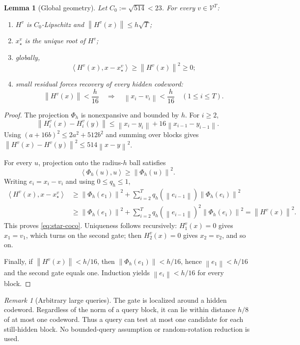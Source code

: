 \documentclass[11pt,a4paper]{article}
\newcommand{\norm}[1]{\left\lVert #1\right\rVert}
\newcommand{\inner}[2]{\left\langle #1,#2\right\rangle}
\newcommand{\cV}{\mathcal V}
\newtheorem{lemma}[theorem]{Lemma}
\theoremstyle{definition}
\theoremstyle{remark}
\newtheorem{remark}[theorem]{Remark}
\begin{document}
\begin{lemma}[Global geometry]\label{lem:geometry}
Let $C_0:=\sqrt{514}<23$.  For every $v\in\cV^T$:
\begin{enumerate}[label=(\roman*)]
\item $H^v$ is $C_0$-Lipschitz and $\norm{H^v(x)}\le h\sqrt T$;
\item $x_\star^v$ is the unique root of $H^v$;
\item globally,
\begin{equation}
 \inner{H^v(x)}{x-x_\star^v}\ge\norm{H^v(x)}^2\ge0;
 \label{eq:star-coco}
\end{equation}
\item small residual forces recovery of every hidden codeword:
\begin{equation}
 \norm{H^v(x)}<\frac h{16}
 \quad\Longrightarrow\quad
 \norm{x_i-v_i}<\frac h{16}
 \quad(1\le i\le T).
 \label{eq:decode}
\end{equation}
\end{enumerate}
\end{lemma}

\begin{proof}
The projection $\Phi_h$ is nonexpansive and bounded by $h$.  For $i\ge2$,
\[
 \norm{H_i^v(x)-H_i^v(y)}
 \le \norm{x_i-y_i}+16\norm{x_{i-1}-y_{i-1}}.
\]
Using $(a+16b)^2\le2a^2+512b^2$ and summing over blocks gives
$\norm{H^v(x)-H^v(y)}^2\le514\norm{x-y}^2$.

For every $u$, projection onto the radius-$h$ ball satisfies
\[
 \inner{\Phi_h(u)}{u}\ge\norm{\Phi_h(u)}^2.
\]
Writing $e_i=x_i-v_i$ and using $0\le q_h\le1$,
\begin{align*}
 \inner{H^v(x)}{x-x_\star^v}
 &\ge \norm{\Phi_h(e_1)}^2
 +\sum_{i=2}^T q_h(\norm{e_{i-1}})\norm{\Phi_h(e_i)}^2\\
 &\ge \norm{\Phi_h(e_1)}^2
 +\sum_{i=2}^T q_h(\norm{e_{i-1}})^2\norm{\Phi_h(e_i)}^2
 =\norm{H^v(x)}^2.
\end{align*}
This proves \eqref{eq:star-coco}.  Uniqueness follows recursively: $H_1^v(x)=0$ gives $x_1=v_1$, which turns on the second gate; then $H_2^v(x)=0$ gives $x_2=v_2$, and so on.

Finally, if $\norm{H^v(x)}<h/16$, then $\norm{\Phi_h(e_1)}<h/16$, hence $\norm{e_1}<h/16$ and the second gate equals one.  Induction yields $\norm{e_i}<h/16$ for every block.
\end{proof}

\begin{remark}[Arbitrary large queries]
The gate is localized around a hidden codeword.  Regardless of the norm of a query block, it can lie within distance $h/8$ of at most one codeword.  Thus a query can test at most one candidate for each still-hidden block.  No bounded-query assumption or random-rotation reduction is used.
\end{remark}
\end{document}
